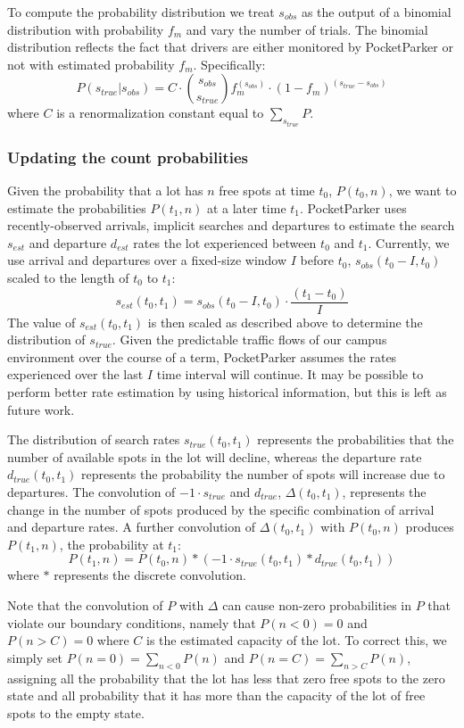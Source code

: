 To compute the probability distribution we treat $s_{obs}$ as the output of a
binomial distribution with probability $f_m$ and vary the number of trials.
The binomial distribution reflects the fact that drivers are either monitored
by PocketParker or not with estimated probability $f_m$. Specifically:
%
\[
%
P(s_{true}| s_{obs}) = C \cdot {s_{obs} \choose s_{true}}
f_m^{(s_{obs})} \cdot (1 - f_m)^{(s_{true} - s_{obs})}
%
\]
%
where $C$ is a renormalization constant equal to $\sum_{s_{true}} P$.

\subsubsection{Updating the count probabilities}

Given the probability that a lot has $n$ free spots at time $t_0$, $P(t_0,
n)$, we want to estimate the probabilities $P(t_1, n)$ at a later time $t_1$.
PocketParker uses recently-observed arrivals, implicit searches and
departures to estimate the search $s_{est}$ and departure $d_{est}$ rates the
lot experienced between $t_0$ and $t_1$. Currently, we use arrival and
departures over a fixed-size window $I$ before $t_0$, $s_{obs}(t_0 -
I, t_0)$ scaled to the length of $t_0$ to $t_1$:
%
\[s_{est}(t_0, t_1) = s_{obs}(t_0 - I, t_0) \cdot \frac{(t_1 - t_0)}{I} \]
%
The value of $s_{est}(t_0, t_1)$ is then scaled as described above to
determine the distribution of $s_{true}$.  Given the predictable traffic flows
of our campus environment over the course of a term, PocketParker assumes the
rates experienced over the last $I$ time interval will continue. It may be
possible to perform better rate estimation by using historical information,
but this is left as future work.

The distribution of search rates $s_{true}(t_0, t_1)$ represents the
probabilities that the number of available spots in the lot will decline,
whereas the departure rate $d_{true}(t_0, t_1)$ represents the probability
the number of spots will increase due to departures. The convolution of $-1
\cdot s_{true}$ and $d_{true}$, $\Delta(t_0, t_1)$, represents the change in
the number of spots produced by the specific combination of arrival and
departure rates. A further convolution of $\Delta(t_0, t_1)$ with $P(t_0,
n)$ produces $P(t_1, n)$, the probability at $t_1$:
%
\[ P(t_1, n) = P(t_0, n) * (-1 \cdot s_{true}(t_0, t_1) * d_{true}(t_0,
t_1)) \]
%
where $*$ represents the discrete convolution.

Note that the convolution of $P$ with $\Delta$ can cause non-zero
probabilities in $P$ that violate our boundary conditions, namely that
$P(n < 0) = 0$ and $P(n > C) = 0$ where $C$ is the estimated capacity of
the lot. To correct this, we simply set $P(n = 0) = \sum_{n < 0} P(n)$
and $P(n = C) = \sum_{n > C} P(n)$, assigning all the probability that
the lot has less that zero free spots to the zero state and all probability
that it has more than the capacity of the lot of free spots to the empty
state.

